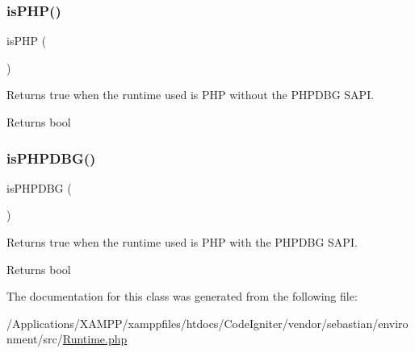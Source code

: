 \subsubsection{\texorpdfstring{is\+P\+H\+P()}{isPHP()}}
{\footnotesize\ttfamily is\+P\+HP (\begin{DoxyParamCaption}{ }\end{DoxyParamCaption})}

Returns true when the runtime used is P\+HP without the P\+H\+P\+D\+BG S\+A\+PI.

\begin{DoxyReturn}{Returns}
bool 
\end{DoxyReturn}
\mbox{\label{class_sebastian_bergmann_1_1_environment_1_1_runtime_acf30ff73d108770a401801df1e1a7a2b}} 
\subsubsection{\texorpdfstring{is\+P\+H\+P\+D\+B\+G()}{isPHPDBG()}}
{\footnotesize\ttfamily is\+P\+H\+P\+D\+BG (\begin{DoxyParamCaption}{ }\end{DoxyParamCaption})}

Returns true when the runtime used is P\+HP with the P\+H\+P\+D\+BG S\+A\+PI.

\begin{DoxyReturn}{Returns}
bool 
\end{DoxyReturn}


The documentation for this class was generated from the following file\+:\begin{DoxyCompactItemize}
\item 
/\+Applications/\+X\+A\+M\+P\+P/xamppfiles/htdocs/\+Code\+Igniter/vendor/sebastian/environment/src/\mbox{\hyperlink{_runtime_8php}{Runtime.\+php}}\end{DoxyCompactItemize}
